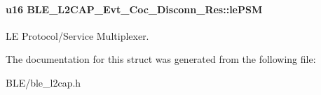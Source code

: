 \paragraph[{\texorpdfstring{le\+P\+SM}{lePSM}}]{\setlength{\rightskip}{0pt plus 5cm}u16 B\+L\+E\+\_\+\+L2\+C\+A\+P\+\_\+\+Evt\+\_\+\+Coc\+\_\+\+Disconn\+\_\+\+Res\+::le\+P\+SM}\hypertarget{struct_b_l_e___l2_c_a_p___evt___coc___disconn___res_a6cc42e549d86745abbea6ba1667532d2}{}\label{struct_b_l_e___l2_c_a_p___evt___coc___disconn___res_a6cc42e549d86745abbea6ba1667532d2}
LE Protocol/\+Service Multiplexer. 

The documentation for this struct was generated from the following file\+:\begin{DoxyCompactItemize}
\item 
B\+L\+E/ble\+\_\+l2cap.\+h\end{DoxyCompactItemize}
